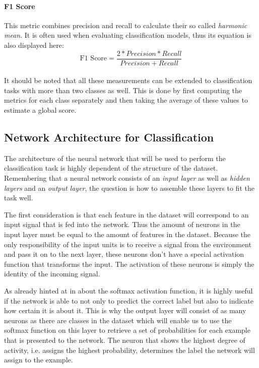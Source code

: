 \paragraph{F1 Score} This metric combines precision and recall to
calculate their so called \textit{harmonic mean}. It is often used
when evaluating classification models, thus its equation is also
displayed here:
\begin{equation}
  \text{F1 Score} = \frac{2*Precision*Recall}{Precision+Recall}
\end{equation}
\\
It should be noted that all these measurements can be extended to
classification tasks with more than two classes as well. This is done
by first computing the metrics for each class separately and then
taking the average of these values to estimate a global score.

\subsection{Network Architecture for Classification}

The architecture of the neural network that will be used to perform
the classification task is highly dependent of the structure of the
dataset. Remembering that a neural network consists of an
\textit{input layer} as well as \textit{hidden layers} and an
\textit{output layer}, the question is how to assemble these layers to
fit the task well.

The first consideration is that each feature in the dataset will
correspond to an input signal that is fed into the network. Thus the
amount of neurons in the input layer must be equal to the amount of
features in the dataset. Because the only responsibility of the input
units is to receive a signal from the environment and pass it on to
the next layer, these neurons don't have a special activation function
that transforms the input. The activation of these neurons is simply
the identity of the incoming signal.

As already hinted at in  about the softmax
activation function, it is highly useful if the
network is able to not only to predict the correct label but also to
indicate how certain it is about it. This is why the output layer will
consist of as many neurons as there are classes in the dataset which
will enable us to use the softmax function on this layer to retrieve a
set of probabilities for each example that is presented to the
network. The neuron that shows the highest degree of activity,
i.e. assigns the highest probability, determines the label the network
will assign to the example.

